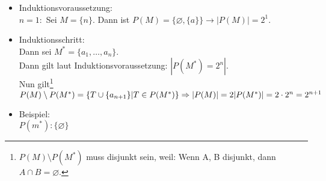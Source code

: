 \documentclass[12pt,a4paper]{report}
\begin{document}
\begin{enumerate}
		\begin{itemize}
			\item Induktionsvoraussetzung:\\
			$ n=1: $ Sei $M=\{n\}$. Dann ist $P(M)=\{\varnothing,\{a\}\} \rightarrow |P(M)|=2^1$.
			\item Induktionsschritt:\\
			Dann sei $M^*=\{a_1,\dots, a_n\}$.\\
			Dann gilt laut Induktionsvoraussetzung: $|P(M^*)=2^n|$.
			\\Nun gilt\footnote{$P(M) \setminus P(M^*)$ muss disjunkt sein, weil: Wenn A, B disjunkt, dann $ A \cap B = \varnothing$.} $P(M) \setminus P(M^*) = \{T \cup \{a_{n+1}\} | T \in P(M^*)\} \\
			\Rightarrow |P(M)|=2|P(M^*)|=2\cdot 2^n= 2^{n+1}$
			\item Beispiel:\\
			$ P(m^*):\{\varnothing\}$
		\end{itemize}
	\end{enumerate}
\end{document}
